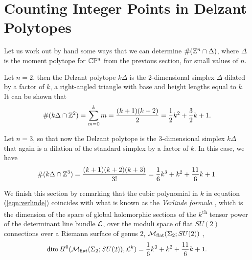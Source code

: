 \section{Counting Integer Points in Delzant Polytopes}

Let us work out by hand some ways that we can determine $\#(\mathbb{Z}^{n}\cap \Delta)$, where $\Delta$ is the moment polytope for $\mathbb{C}\mathbb{P}^{n}$ from the previous section, for small values of $n$.

\begin{ex}
	Let $n = 2$, then the Delzant polytope $k\Delta$ is the 2-dimensional simplex $\Delta$ dilated by a factor of $k$, \ie a right-angled triangle with base and height lengths equal to $k$. It can be shown that
	$$
		\#(k\Delta \cap \mathbb{Z}^{2}) = \sum_{m=0}^{k}m = \frac{(k+1)(k+2)}{2} = \frac{1}{2}k^{2} + \frac{3}{2}k + 1.  
	$$
\end{ex}

\begin{ex}
	Let $n = 3$, so that now the Delzant polytope is the $3$-dimensional simplex $k\Delta$ that again is a dilation of the standard simplex by a factor of $k$. In this case, we have
	\begin{equation}
	\label{eqn:verlinde}
		\#(k\Delta \cap \mathbb{Z}^{3}) = \frac{(k+1)(k+2)(k+3)}{3!} = \frac{1}{6}k^{3} + k^{2} + \frac{11}{6}k + 1.
	\end{equation}
\end{ex}

We finish this section by remarking that the cubic polynomial in $k$ in equation (\ref{eqn:verlinde}) coincides with what is known as the \emph{Verlinde formula} \cite{Ver88}, which is the dimension of the space of global holomorphic sections of the $k$\textsuperscript{th} tensor power of the determinant line bundle $\mathcal{L}$, over the moduli space of flat $SU(2)$ connections over a Riemann surface of genus 2, $\mathcal{M}_{\text{flat}}(\Sigma_{2};SU(2))$ \cite{GP17}, \ie
$$
	\dim H^{0}(\mathcal{M}_{\text{flat}}(\Sigma_{2};SU(2)), \mathcal{L}^{k}) = \frac{1}{6}k^{3} + k^{2} + \frac{11}{6}k + 1.
$$
